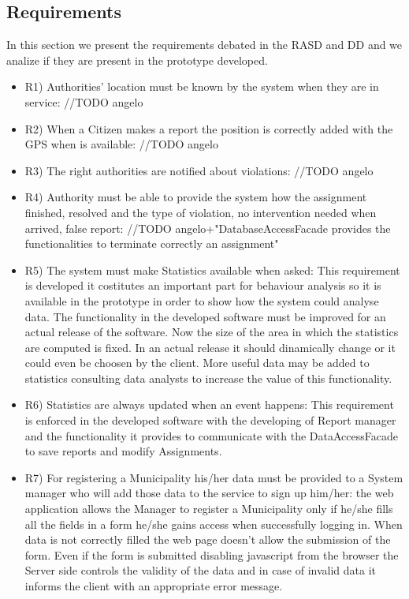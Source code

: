 \subsection{Requirements}
In this section we present the requirements debated in the RASD and DD and we analize if they are present in the prototype developed.
\begin{itemize}
\item R1) Authorities’ location must be known by the system when they are in service:
//TODO angelo

\item R2) When a Citizen makes a report the position is correctly added with the GPS when is available:
//TODO angelo

\item R3) The right authorities are notified about violations:
//TODO angelo

\item R4) Authority must be able to provide the system how the assignment finished, resolved and the
type of violation, no intervention needed when arrived, false report: //TODO angelo+"DatabaseAccessFacade provides 
the functionalities to terminate correctly an assignment"

\item R5) The system must make Statistics available when asked: This requirement is developed it costitutes an important part
for behaviour analysis so it is available in the prototype in order to show how the system could analyse data.
The functionality in the developed software must be improved for an actual release of the software. Now the size of the area in which the statistics are computed is fixed. In an actual release it should dinamically change or it could even be choosen by the client. More useful data may be added to statistics consulting data analysts to increase the value of this functionality.

\item  R6) Statistics are always updated when an event happens: This requirement is enforced in the developed software with the 
developing of Report manager and the functionality it provides to communicate with the DataAccessFacade to save reports and 
modify Assignments.

\item  R7) For registering a Municipality his/her data must be provided to a System manager who will
add those data to the service to sign up him/her: the web application allows the Manager to register a Municipality only if he/she
fills all the fields in a form he/she gains access when successfully logging in. When data is not correctly filled the web page doesn't
allow the submission of the form. Even if the form is submitted disabling javascript from the browser the Server side controls the 
validity of the data and in case of invalid data it informs the client with an appropriate error message.


\end{itemize}
